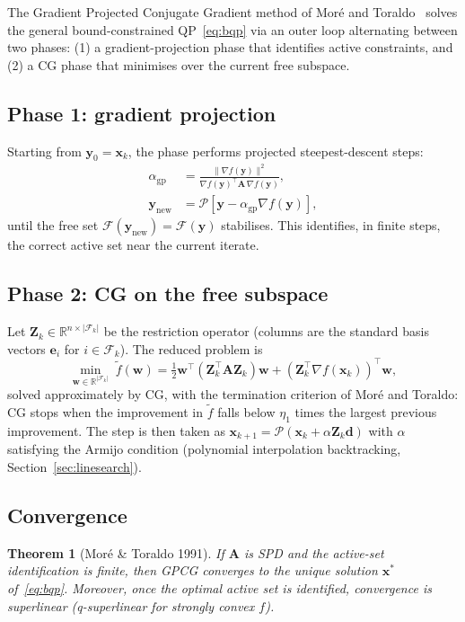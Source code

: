 \documentclass[11pt,a4paper]{article}
\newtheorem{theorem}{Theorem}[section]
\newcommand{\R}{\mathbb{R}}
\newcommand{\bA}{\mathbf{A}}
\newcommand{\bd}{\mathbf{d}}
\newcommand{\bw}{\mathbf{w}}
\newcommand{\bx}{\mathbf{x}}
\newcommand{\by}{\mathbf{y}}
\newcommand{\bZ}{\mathbf{Z}}
\newcommand{\be}{\mathbf{e}}
\newcommand{\Proj}{\mathcal{P}}
\newcommand{\calF}{\mathcal{F}}
\newcommand{\norm}[1]{\|#1\|}
\newcommand{\tr}{\top}
\begin{document}
The Gradient Projected Conjugate Gradient method of Mor\'e and
Toraldo~\cite{MoreToraldo1991} solves the general bound-constrained
QP~\eqref{eq:bqp} via an outer loop alternating between two phases:
(1) a gradient-projection phase that identifies active constraints, and
(2) a CG phase that minimises over the current free subspace.

\subsection{Phase 1: gradient projection}

Starting from $\by_0 = \bx_k$, the phase performs projected steepest-descent steps:
\begin{align}
  \alpha_{\mathrm{gp}} &= \frac{\norm{\nabla f(\by)}^2}{\nabla f(\by)^\tr \bA\,\nabla f(\by)},
  \label{eq:gp-step}\\[4pt]
  \by_{\mathrm{new}}   &= \Proj[\by - \alpha_{\mathrm{gp}}\nabla f(\by)],
\end{align}
until the free set $\calF(\by_{\mathrm{new}}) = \calF(\by)$ stabilises.
This identifies, in finite steps, the correct active set near the current iterate.

\subsection{Phase 2: CG on the free subspace}

Let $\bZ_k \in \R^{n \times |\calF_k|}$ be the restriction operator (columns are
the standard basis vectors $\be_i$ for $i \in \calF_k$).
The reduced problem is
\begin{equation}
  \min_{\bw \in \R^{|\calF_k|}}\; \tilde f(\bw)
  = \tfrac{1}{2}\bw^\tr(\bZ_k^\tr\bA\bZ_k)\bw
    + (\bZ_k^\tr\nabla f(\bx_k))^\tr\bw,
  \label{eq:reduced}
\end{equation}
solved approximately by CG, with the termination criterion of
Mor\'e and Toraldo: CG stops when the improvement in $\tilde f$
falls below $\eta_1$ times the largest previous improvement.
The step is then taken as
$\bx_{k+1} = \Proj(\bx_k + \alpha\bZ_k\bd)$
with $\alpha$ satisfying the Armijo condition (polynomial interpolation
backtracking, Section~\ref{sec:linesearch}).

\subsection{Convergence}

\begin{theorem}[Mor\'e \& Toraldo 1991]
  If $\bA$ is SPD and the active-set identification is finite, then GPCG
  converges to the unique solution $\bx^*$ of~\eqref{eq:bqp}.
  Moreover, once the optimal active set is identified, convergence is
  superlinear (q-superlinear for strongly convex $f$).
\end{theorem}
\end{document}
